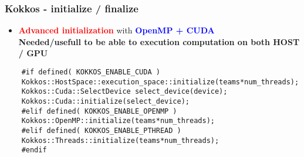 \begin{frame}[fragile=singleslide]
  \frametitle{Kokkos - initialize / finalize}

  \begin{itemize}
  \item \textcolor{red}{\textbf{Advanced initialization}} with \textcolor{blue}{\textbf{OpenMP + CUDA}}\\
    \textbf{Needed/usefull to be able to execution computation on both HOST / GPU}
  \end{itemize}
  \begin{verbatim}
    #if defined( KOKKOS_ENABLE_CUDA )
    Kokkos::HostSpace::execution_space::initialize(teams*num_threads);
    Kokkos::Cuda::SelectDevice select_device(device);
    Kokkos::Cuda::initialize(select_device);
    #elif defined( KOKKOS_ENABLE_OPENMP )
    Kokkos::OpenMP::initialize(teams*num_threads);
    #elif defined( KOKKOS_ENABLE_PTHREAD )
    Kokkos::Threads::initialize(teams*num_threads);
    #endif
  \end{verbatim}
\end{frame}


